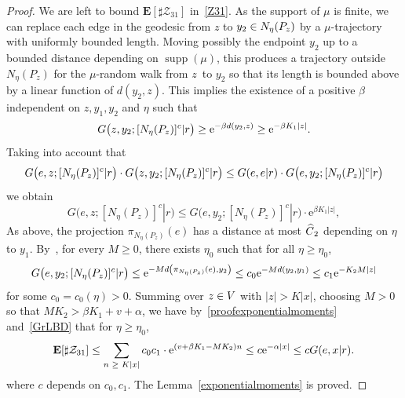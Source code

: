 \documentclass[10pt]{amsart}
\theoremstyle{definition}\newtheorem{defi}[theo]{Definition}\newtheorem{rema}[theo]{Remark}\newtheorem{exam}[theo]{Example}\newtheorem{exem}[theo]{Example}\newtheorem{nota}[theo]{Notation}
\newcommand{\rme}{\mathrm{e}}
\newcommand{\bfE}{\mathbf{E}}
\newcommand{\clZ}{\mathcal{Z}}
\DeclareMathOperator{\supp}{supp}
\let\originalleft\left
\let\originalright\right
\renewcommand{\left}{\mathopen{}\mathclose\bgroup\originalleft}
\renewcommand{\right}{\aftergroup\egroup\originalright}
\let\oldin\in
\renewcommand{\in}{\mathchoice{\oldin}{\oldin}{\,\oldin\,}{\,\oldin\,}}
\let\oldge\ge
\renewcommand{\ge}{\mathchoice{\oldge}{\oldge}{\,\oldge\,}{\,\oldge\,}}
\let\oldle\le
\renewcommand{\le}{\mathchoice{\oldle}{\oldle}{\,\oldle\,}{\,\oldle\,}}
\let\oldhat\hat
\renewcommand*{\hat}[1]{\mathchoice{\widehat{#1}}{\widehat{#1}}{\oldhat{#1}}{\oldhat{#1}}}
\begin{document}
\begin{proof}
We are left to bound $\bfE[\sharp \clZ_{31}]$ in~\eqref{Z31}. As the support of $\mu$ is finite, we can replace each edge in the geodesic from $z$ to $y_2\in N_\eta(P_z)$ by a $\mu$-trajectory with uniformly bounded length. Moving possibly the endpoint $y_2$ up to a bounded distance depending on $\supp(\mu)$, this produces a trajectory outside $N_\eta(P_z)$ for the $\mu$-random walk from $z$~to $y_2$ so that its length is bounded above by a linear function of $d(y_2,z)$. This implies the existence of a positive $\beta$ independent on $z, y_1,y_2$ and $\eta$ such that
\[
G\bigl(z,y_2;[N_\eta(P_z)]^c|r\bigr)\geq \rme^{-\beta d(y_2,z)}\ge \rme^{-\beta K_1 |z|}.
\]
Taking into account that
\[
G\bigl(e,z;[N_\eta(P_z)]^c|r\bigr) \cdot G\bigl(z,y_2;[N_\eta(P_z)]^c|r\bigr) \le G(e,e|r) \cdot G\bigl(e,y_2;[N_\eta(P_z)]^c|r\bigr)
\]
we obtain
\begin{equation}\label{proofexponentialmoments}
G\bigl(e,z;[N_\eta(P_z)]^c|r\bigr)\leq G\bigl(e,y_2;[N_\eta(P_z)]^c|r\bigr)\cdot \rme^{\beta K_1 |z|},
\end{equation}
As above, the projection $\pi_{N_{\eta}(P_z)}(e)$ has a distance at most $\hat C_2$ depending on $\eta$ to $y_1$. By~\cite[Lemma~2.12]{DWY}, for every $M\geq 0$, there exists $\eta_0$ such that for all $\eta\geq \eta_0$,
\[
G\bigl(e,y_2;[N_\eta(P_z)]^c|r\bigr)\leq \rme^{-M d\left(\pi_{N_{\eta}(P_z)}(e),y_2\right)}\leq c_0 \rme^{-M d(y_2,y_1)}\le c_1\rme^{-K_2 M|z|}
\]
for some $c_0=c_0(\eta)>0$.
Summing over $z\in V$ with $|z|>K|x|$, choosing $M>0$ so that $M K_2>\beta K_1+v+\alpha$, we have by~\eqref{proofexponentialmoments} and~\eqref{GrLBD} that for $\eta\geq \eta_0$,
\[
\bfE[\sharp \clZ_{31}]\leq \sum_{n\ge K|x|} c_0c_1 \cdot \rme^{(v+\beta K_1- M K_2)n}\le c\rme^{-\alpha |x|} \le c G(e,x|r).
\]
where $c$ depends on $c_0, c_1$. The Lemma~\ref{exponentialmoments} is proved.
\end{proof}
\end{document}
